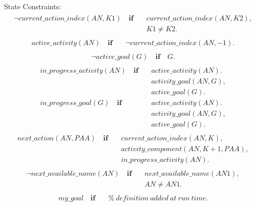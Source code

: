 \documentclass[11pt, oneside]{article}
\begin{document}
State Constraints:
\begin{align}\begin{split}
\neg current\_action\_index(AN, K1)  \quad  \mathbf{if}\quad & current\_action\_index(AN, K2), \\
 \quad & K1\neq K2.
 \end{split}\end{align}
\begin{align}\begin{split}
 active\_activity(AN)\quad  \mathbf{if} \quad & \neg current\_action\_index(AN, -1). 
\end{split}\end{align}
\begin{align}\begin{split}
\neg active\_goal(G) \quad \mathbf{if} \quad G. 
\end{split}\end{align}
\begin{align}\begin{split}
in\_progress\_activity(AN) \quad \mathbf{if}\quad &active\_activity(AN).\\
&activity\_goal(AN, G),\\
&active\_goal(G).\\
in\_progress\_goal(G) \quad \mathbf{if}\quad &active\_activity(AN).\\
&activity\_goal(AN, G),\\
&active\_goal(G). 
\end{split}\end{align}
\begin{align}\begin{split}
next\_action(AN, PAA)\quad \mathbf{if}\quad & current\_action\_index(AN, K),\\
&activity\_component(AN, K+1, PAA),\\
&in\_progress\_activity(AN).
\end{split}\end{align}
\begin{align}\begin{split}
\neg next\_available\_name(AN) \quad \mathbf{if}\quad & next\_available\_name(AN1), \\
& AN\neq AN1.
\end{split}\end{align}
\begin{align}\begin{split}
my\_goal \quad \mathbf{if}\quad & \%~definition~added~at~run~time.
\end{split}\end{align}
\end{document}

